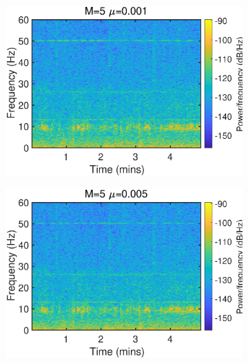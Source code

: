 \begin{figure}[htb]
    \centering
    \hspace{-0.4cm}
    \begin{subfigure}[b]{0.32\textwidth}
     \centering
     \includegraphics[width=\textwidth]{fig/23/23d2.eps}
    \end{subfigure}
    \hspace{-0.4cm}
    \begin{subfigure}[b]{0.32\textwidth}
     \centering
     \includegraphics[width=\textwidth]{fig/23/23d3.eps}
    \end{subfigure} 
    \hspace{-0.4cm}
    \begin{subfigure}[b]{0.32\textwidth}
     \centering

\end{subfigure}
\end{figure}
